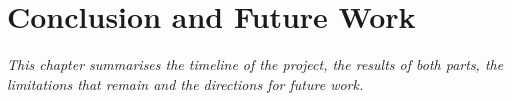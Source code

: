 \chapter{Conclusion and Future Work}
\label{chapter:tongket}

\textit{This chapter summarises the timeline of the project, the results of both parts, the limitations that remain and the directions for future work.}





